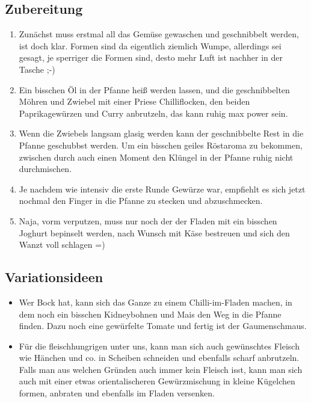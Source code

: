   \subsection*{Zubereitung}
    \begin{enumerate}
      \item Zunächst muss erstmal all das Gemüse gewaschen und geschnibbelt
            werden, ist doch klar. Formen sind da eigentlich ziemlich Wumpe,
            allerdings sei gesagt, je sperriger die Formen sind, desto mehr
            Luft ist nachher in der Tasche ;-)
      \item Ein bisschen Öl in der Pfanne heiß werden lassen, und die
            geschnibbelten Möhren und Zwiebel mit einer Priese Chilliflocken,
            den beiden Paprikagewürzen und Curry anbrutzeln, das kann ruhig max
            power sein.
      \item Wenn die Zwiebels langsam glasig werden kann der geschnibbelte Rest 
            in die Pfanne geschubbst werden. Um ein bisschen geiles Röstaroma zu
            bekommen, zwischen durch auch einen Moment den Klüngel in der Pfanne
            ruhig nicht durchmischen.
      \item Je nachdem wie intensiv die erste Runde Gewürze war, empfiehlt es sich
            jetzt nochmal den Finger in die Pfanne zu stecken und abzuschmecken.
      \item Naja, vorm verputzen, muss nur noch der der Fladen mit ein bisschen
            Joghurt bepinselt werden, nach Wunsch mit Käse bestreuen und sich
            den Wanzt voll schlagen =)
    \end{enumerate}

  \subsection*{Variationsideen}
    \begin{itemize}
      \item Wer Bock hat, kann sich das Ganze zu einem Chilli-im-Fladen machen,
            in dem noch ein bisschen Kidneybohnen und Mais den Weg in die Pfanne
            finden. Dazu noch eine gewürfelte Tomate und fertig ist der
            Gaumenschmaus.
      \item Für die fleischhungrigen unter uns, kann man sich auch gewünschtes
            Fleisch wie Hänchen und co. in Scheiben schneiden und ebenfalls
            scharf anbrutzeln. Falls man aus welchen Gründen auch immer kein
            Fleisch isst, kann man sich auch
             mit einer etwas
            orientalischeren Gewürzmischung in kleine Kügelchen formen, anbraten
            und ebenfalls im Fladen versenken.
    \end{itemize}
